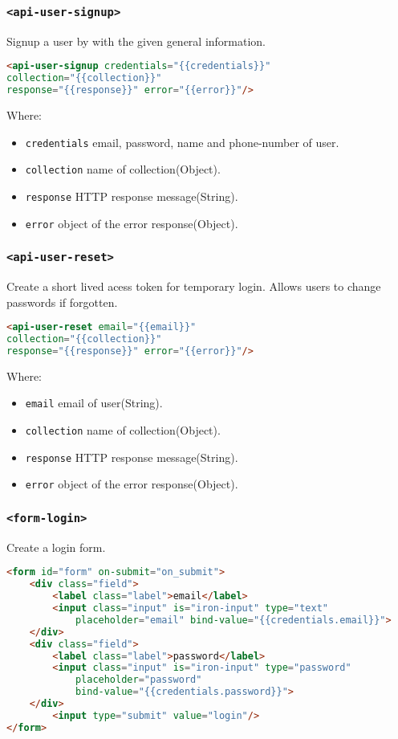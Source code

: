 \subsubsection{\texttt{<api-user-signup>}}

Signup a user by with the given general information.
\begin{lstlisting}[language=html]
<api-user-signup credentials="{{credentials}}"
collection="{{collection}}" 
response="{{response}}" error="{{error}}"/>
\end{lstlisting}
Where:
\begin{itemize}
\item \texttt{credentials} email, password, name and phone-number of user.
\item \texttt{collection} name of collection(Object).
\item \texttt{response}	HTTP response message(String).
\item \texttt{error} object of the error response(Object).
\end{itemize}

\subsubsection{\texttt{<api-user-reset>}}

Create a short lived acess token for temporary login. Allows users to change passwords if forgotten.
\begin{lstlisting}[language=html]
<api-user-reset email="{{email}}"
collection="{{collection}}" 
response="{{response}}" error="{{error}}"/>
\end{lstlisting}
Where:
\begin{itemize}
\item \texttt{email} email of user(String).
\item \texttt{collection} name of collection(Object).
\item \texttt{response}	HTTP response message(String).
\item \texttt{error} object of the error response(Object).
\end{itemize}

\subsubsection{\texttt{<form-login>}}

Create a login form.
\begin{lstlisting}[language=html]
<form id="form" on-submit="on_submit">
    <div class="field">
        <label class="label">email</label>
        <input class="input" is="iron-input" type="text" 
    		placeholder="email" bind-value="{{credentials.email}}">
    </div>
    <div class="field">
        <label class="label">password</label>
        <input class="input" is="iron-input" type="password" 
        	placeholder="password" 
        	bind-value="{{credentials.password}}">
    </div>
      	<input type="submit" value="login"/>
</form>
\end{lstlisting}

